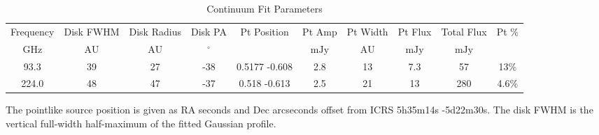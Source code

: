\begin{table*}[htp]
\centering
\caption{Continuum Fit Parameters}
\begin{tabular}{cccccccccc}
\label{tab:continuum_fit_parameters}
Frequency & Disk FWHM & Disk Radius & Disk PA & Pt Position & Pt Amp & Pt Width & Pt Flux & Total Flux & Pt \% \\
$\mathrm{GHz}$ & $\mathrm{AU}$ & $\mathrm{AU}$ & $\mathrm{{}^{\circ}}$ &  & $\mathrm{mJy}$ & $\mathrm{AU}$ & $\mathrm{mJy}$ & $\mathrm{mJy}$ & $\mathrm{}$ \\
\hline
93.3 & 39 & 27 & -38 & 0.5177 -0.608 & 2.8 & 13 & 7.3 & 57 & 13\% \\
224.0 & 48 & 47 & -37 & 0.518 -0.613 & 2.5 & 21 & 13 & 280 & 4.6\% \\
\hline
\end{tabular}

\par The pointlike source position is given as RA seconds and Dec arcseconds offset from ICRS 5h35m14s -5d22m30s.   The disk FWHM is the vertical full-width half-maximum of the fitted Gaussian profile.
\end{table*}
